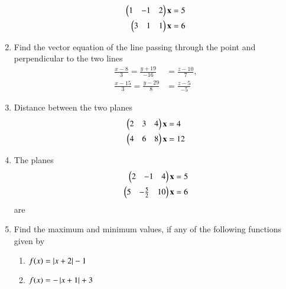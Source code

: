 \begin{enumerate}[label=\arabic*.,ref=\thesubsection.\theenumi]
%
\begin{align}
\begin{pmatrix}1 & -1 & 2\end{pmatrix}\mathbf{x}&=5
\\
\begin{pmatrix}3 & 1 & 1\end{pmatrix}\mathbf{x}&=6
\end{align}
%
\item Find the vector equation of the line passing through the point  and perpendicular to the two lines
\begin{align}
\frac{x-8}{3} = \frac{y+19}{-16} &= \frac{z-10}{7}, 
\\
\frac{x-15}{3} = \frac{y-29}{8} &= \frac{z-5}{-5} 
\end{align}
%
\item Distance between the two planes
%
\begin{align}
\begin{pmatrix}2 & 3 & 4\end{pmatrix}\mathbf{x}&=4
\\
\begin{pmatrix}4 & 6 & 8\end{pmatrix}\mathbf{x}&=12
\end{align}
%
\begin{enumerate}[itemsep=2pt]
\end{enumerate}
\item The planes 
%
\begin{align}
\begin{pmatrix}2 & -1 & 4\end{pmatrix}\mathbf{x}&=5
\\
\begin{pmatrix}5 & -\frac{5}{2} & 10\end{pmatrix}\mathbf{x}&=6
\end{align}
%
are 
%
\begin{enumerate}[itemsep=2pt]
\end{enumerate}
%
\item Find the maximum and minimum values, if any of
the following functions given by 
%
\begin{enumerate}
\item $f(x) = \left\vert x+2\right\vert-1$
\item $f(x) = -\left\vert x+1\right\vert+3$

\end{enumerate}
\end{enumerate}
